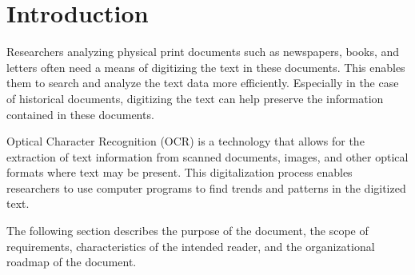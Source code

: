 \documentclass[12pt]{article}
\begin{document}





\section{Introduction}

Researchers analyzing physical print documents such as newspapers, books, and
letters often need a means of digitizing the text in these documents. This
enables them to search and analyze the text data more efficiently. Especially in
the case of historical documents, digitizing the text can help preserve the
information contained in these documents.

Optical Character Recognition (OCR) is a technology that allows for the
extraction of text information from scanned documents, images, and other optical
formats where text may be present. This digitalization process enables
researchers to use computer programs to find trends and patterns in the
digitized text.

The following section describes the purpose of the document, the scope of
requirements, characteristics of the intended reader, and the organizational
roadmap of the document.

\end{document}
